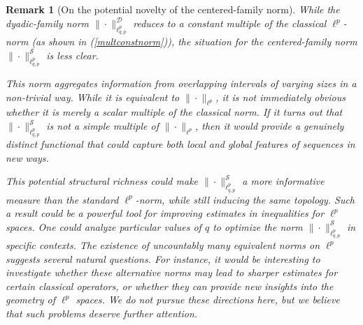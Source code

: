 \documentclass[preprint,12pt]{elsarticle}
\newtheorem{remark}[theorem]{Remark}
\begin{document}
\begin{remark}[On the potential novelty of the centered-family norm]
\label{rem:S-novelty}
While the dyadic-family norm $\|\cdot\|_{\ell_{q,p}^{p}}^{\mathcal{D}}$ reduces to a constant multiple of the classical $\ell^p$-norm (as shown in (\ref{multconstnorm})), the situation for the centered-family norm $\|\cdot\|_{\ell_{q,p}^{p}}^{\mathcal{S}}$ is less clear.

This norm aggregates information from overlapping intervals of varying sizes in a non-trivial way. While it is equivalent to $\|\cdot\|_{\ell^p}$, it is not immediately obvious whether it is merely a scalar multiple of the classical norm. If it turns out that $\|\cdot\|_{\ell_{q,p}^{p}}^{\mathcal{S}}$ is not a simple multiple of $\|\cdot\|_{\ell^p}$, then it would provide a genuinely distinct functional that could capture both local and global features of sequences in new ways.

This potential structural richness could make $\|\cdot\|_{\ell_{q,p}^{p}}^{\mathcal{S}}$ a more informative measure than the standard $\ell^p$-norm, while still inducing the same topology. Such a result could be a powerful tool for improving estimates in inequalities for $\ell^p$ spaces. One could analyze particular values of $q$ to optimize the norm $\|\cdot\|_{\ell_{q,p}^{p}}^{\mathcal{S}}$ in specific contexts. The existence of uncountably many equivalent norms on $\ell^p$ suggests several natural questions. For instance, it would be interesting to investigate whether these alternative norms may lead to sharper estimates for certain classical operators, or whether they can provide new insights into the geometry of $\ell^p$ spaces. We do not pursue these directions here, but we believe that such problems deserve further attention.
\end{remark}
\end{document}
